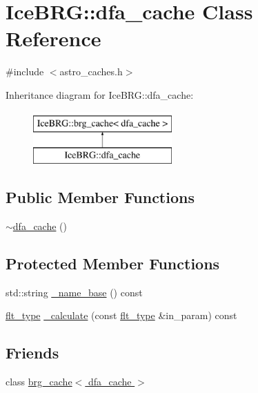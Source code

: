 \hypertarget{classIceBRG_1_1dfa__cache}{}\section{Ice\+B\+R\+G\+:\+:dfa\+\_\+cache Class Reference}
\label{classIceBRG_1_1dfa__cache}


{\ttfamily \#include $<$astro\+\_\+caches.\+h$>$}

Inheritance diagram for Ice\+B\+R\+G\+:\+:dfa\+\_\+cache\+:\begin{figure}[H]
\begin{center}
\leavevmode
\includegraphics[height=2.000000cm]{classIceBRG_1_1dfa__cache}
\end{center}
\end{figure}
\subsection*{Public Member Functions}
\begin{DoxyCompactItemize}
\item 
\hyperlink{classIceBRG_1_1dfa__cache_a18b061367455a52cb3b3aed54449494a}{$\sim$dfa\+\_\+cache} ()
\end{DoxyCompactItemize}
\subsection*{Protected Member Functions}
\begin{DoxyCompactItemize}
\item 
std\+::string \hyperlink{classIceBRG_1_1dfa__cache_abcd1aa788d51b43e58f5e323c0bf8900}{\+\_\+name\+\_\+base} () const 
\item 
\hyperlink{lib_2IceBRG__main_2common_8h_ad0f130a56eeb944d9ef2692ee881ecc4}{flt\+\_\+type} \hyperlink{classIceBRG_1_1dfa__cache_afe887c4a62aaba1061a6084f8e352832}{\+\_\+calculate} (const \hyperlink{lib_2IceBRG__main_2common_8h_ad0f130a56eeb944d9ef2692ee881ecc4}{flt\+\_\+type} \&in\+\_\+param) const 
\end{DoxyCompactItemize}
\subsection*{Friends}
\begin{DoxyCompactItemize}
\item 
class \hyperlink{classIceBRG_1_1dfa__cache_a5a91119ea41de9dd3784d610f0214396}{brg\+\_\+cache$<$ dfa\+\_\+cache $>$}
\end{DoxyCompactItemize}


